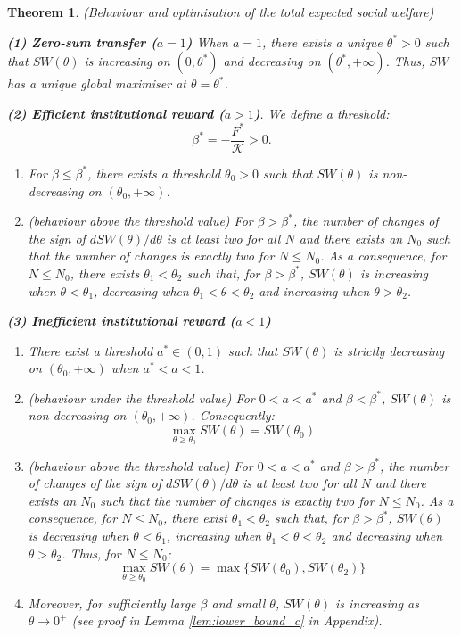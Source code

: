 \documentclass{article}
\newtheorem{theorem}{Theorem}
\begin{document}
\begin{theorem}
(Behaviour and optimisation of the total expected social welfare)
\label{thm: qualitative SW}

\textbf{(1) Zero-sum transfer (${a=1}$)} When $a=1$, there exists a unique $\theta^*>0$ such that $SW(\theta)$ is increasing on $(0,\theta^*)$ and decreasing on $(\theta^*,+\infty)$. Thus, $SW$ has a unique global maximiser at $\theta=\theta^*$.  

\textbf{(2) Efficient institutional reward ($a>1$)}. We define a threshold:    \begin{equation}
            \beta^* = -\frac{F^*}{\mathcal{K}}>0 \label{beta_star}.
        \end{equation}
   
\begin{enumerate}
\item[(i)] For $\beta \le \beta^*$, there exists a threshold $\theta_0 > 0$ such that $SW(\theta)$ is non-decreasing on $(\theta_0, +\infty)$.
\item[(ii)] \textit{(behaviour above the threshold value)} For $\beta > \beta^*$, the number of changes of the sign of $dSW(\theta)/d\theta$ is at least two for all $N$ and there exists an $N_0$ such that the number of changes is exactly two for $N \le N_0$. As a consequence, for $N \le N_0$, there exists $\theta_1 < \theta_2$ such that, for $\beta > \beta^*$, $SW(\theta)$ is increasing when $\theta < \theta_1$, decreasing when $\theta_1 < \theta < \theta_2$ and increasing when $\theta > \theta_2$. 
\end{enumerate}
\textbf{(3) Inefficient institutional reward ($a<1$)}
\begin{enumerate}
        \item[(i)] There exist a threshold $a^* \in (0, 1)$ such that $SW(\theta)$ is strictly decreasing on $(\theta_0, +\infty)$ when $a^*<a<1$.
        \item[(ii)] \textit{(behaviour under the threshold value)} For $0<a<a^*$ and $\beta < \beta^*$, $SW(\theta)$ is non-decreasing on $(\theta_0, +\infty)$. Consequently:
        \[
        \max_{\theta \ge \theta_0} SW(\theta)=SW(\theta_0)
        \]

        \item[(iii)] \textit{(behaviour above the threshold value)} For $0<a<a^*$ and $\beta > \beta^*$, the number of changes of the sign of $dSW(\theta)/d\theta$ is at least two for all $N$ and there exists an $N_0$ such that the number of changes is exactly two for $N \le N_0$. As a consequence, for $N \le N_0$, there exist $\theta_1 < \theta_2$ such that, for $\beta > \beta^*$, $SW(\theta)$ is decreasing when $\theta < \theta_1$, increasing when $\theta_1 < \theta < \theta_2$ and decreasing when $\theta > \theta_2$. Thus, for $N \le N_0$:
        \[
        \max_{\theta \ge \theta_0}SW(\theta)=\max\{SW(\theta_0),SW(\theta_2)\}  
        \]

        \item[(iv)] Moreover, for sufficiently large $\beta$ and small $\theta$, $SW(\theta)$ is increasing as $\theta \to 0^+$ (see proof in  Lemma \ref{lem:lower_bound_c} in Appendix).
    \end{enumerate}
\end{theorem}
\end{document}
